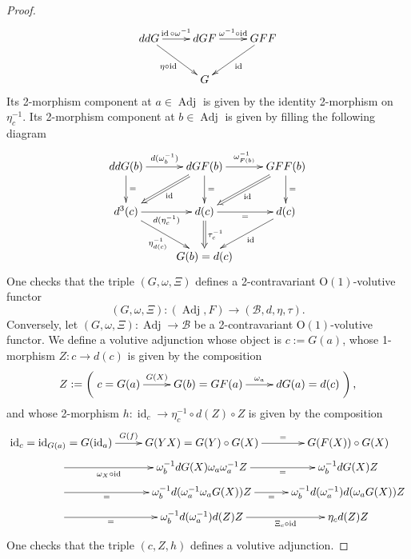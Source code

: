 \documentclass[10pt,a4paper]{amsart}
\newcommand{\Adj}{\operatorname{Adj}}%
\newcommand{\B}{\mathcal{B}}
\newcommand{\Oone}{\operatorname{O(1)}}
\newcommand{\id}{\operatorname{id}}%
\begin{document}
\begin{proof}
    \begin{equation}
        \begin{aligned}
        \xymatrix{
        ddG \ar[r]^-{\id \circ \omega^{-1}} \ar[dr]_-{\eta \circ \id} & dGF \ar[r]^-{\omega^{-1} \circ \id} & GFF \ar[dl]^-{\id}\\
        & G &
        }
        \end{aligned}
    \end{equation}
    Its 2-morphism component at $a \in \Adj$ is given by the identity 2-morphism on $\eta_c^{-1}$. Its 2-morphism component at $b \in \Adj$ is given 
    by filling the following diagram 
    \begin{equation}
        \begin{aligned}
        \xymatrix{
        ddG(b) \ar[d]^-{=} \ar[r]^-{d(\omega_b^{-1})} & dGF(b) \ar[r]^-{\omega_{F(b)}^{-1}} \ar[d]^-{=} \ar@{=>}[dl]^-{\id} & GFF(b) \ar[d]^-{=} \ar@{=>}[dl]^-{\id} \\
        d^3(c) \ar[dr]_-{\eta_{d(c)}^{-1}} \ar[r]_-{d(\eta_c^{-1})} & d(c) \ar[r]_-{=} \ar@{=>}[d]^-{\tau_c^{-1}} & d(c) \ar[dl]^-{\id} \\
        & G(b) = d(c) &
        }
        \end{aligned}
    \end{equation}
    One checks that the triple $(G,\omega,\Xi)$ defines a 2-contravariant $\Oone$-volutive functor 
    \begin{equation}
        (G,\omega,\Xi) \colon (\Adj,F) \to (\B,d,\eta,\tau).
    \end{equation}
    Conversely, let $(G,\omega,\Xi) \colon \Adj \to \B$ be a 2-contravariant $\Oone$-volutive functor. We define a volutive adjunction 
    whose object is $c := G(a)$, whose 1-morphism $Z \colon c \to d(c)$ is given by the composition 
    \begin{equation}
        Z := \left( \xymatrix{ c = G(a) \ar[r]^-{G(X)} & G(b) = GF(a) \ar[r]^-{\omega_a} & dG(a) = d(c) } \right),
    \end{equation}
    and whose 2-morphism $h \colon \id_c \to \eta_c^{-1} \circ d(Z) \circ Z$ is given by the composition
    \begin{equation}
        \begin{aligned}
        \xymatrix@R=0.5em{
            \id_c = \id_{G(a)} = G(\id_a) \ar[r]^-{G(f)} & G(YX) = G(Y) \circ G(X) \ar[r]^-{=} & G(F(X)) \circ G(X)  \\
            \ar[r]_-{\omega_X \circ \id} & \omega_b^{-1}  dG(X)  \omega_a \omega_a^{-1} Z \ar[r]_-{=} & \omega_b^{-1} dG(X) Z \\
            \ar[r]_-{=} & \omega_b^{-1} d(\omega_a^{-1}\omega_a G(X)) Z \ar[r]_-{=} & \omega_b^{-1} d(\omega_a^{-1})d(\omega_a G(X)) Z\\
            \ar[r]_-{=} & \omega_b^{-1} d(\omega_a^{-1}) d(Z) Z \ar[r]_-{\Xi_c \circ \id} & \eta_c d(Z) Z
        }
        \end{aligned}
    \end{equation}
    One checks that the triple $(c,Z,h)$ defines a volutive adjunction.
\end{proof}
\end{document}
